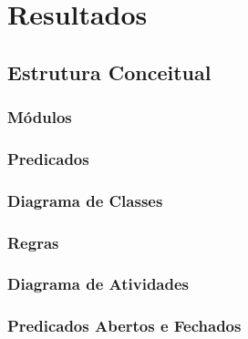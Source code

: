 \documentclass[openright]{normas-utf-tex} %
\begin{document}
		

\chapter{Resultados}
\label{chap:resul}

	
	
	\section{Estrutura Conceitual}

	

		\subsection{Módulos} 
			\label{mods}			
			
		
		\subsection{Predicados} 
			\label{predic}
			
			
		\subsection{Diagrama de Classes}
			


		\subsection{Regras}
			\label{regras}
			

		\subsection{Diagrama de Atividades} \label{umldiagram}
		
			

		\subsection{Predicados Abertos e Fechados} \label{cenarios}
		
			
\end{document}
